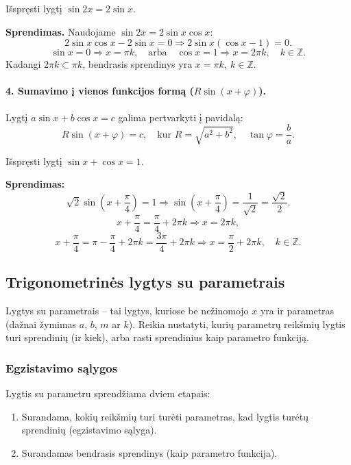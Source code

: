 \begin{example}
Išspręsti lygtį \(\sin 2x = 2\sin x\).

\textbf{Sprendimas.} Naudojame \(\sin 2x = 2\sin x \cos x\):
\[
2\sin x \cos x - 2\sin x = 0 \Rightarrow 2\sin x(\cos x - 1) = 0.
\]
\[
\sin x = 0 \Rightarrow x = \pi k, \quad \text{arba} \quad \cos x = 1 \Rightarrow x = 2\pi k, \quad k \in \mathbb{Z}.
\]
Kadangi \(2\pi k \subset \pi k\), bendrasis sprendinys yra \(x = \pi k,\ k \in \mathbb{Z}\).
\end{example}

\paragraph{4. Sumavimo į vienos funkcijos formą (\(R\sin(x+\varphi)\)).}

Lygtį \(a\sin x + b\cos x = c\) galima pertvarkyti į pavidalą:
\[
R\sin(x + \varphi) = c, \quad \text{kur } R = \sqrt{a^2 + b^2},\quad \tan\varphi = \frac{b}{a}.
\]

\begin{example}
Išspręsti lygtį \(\sin x + \cos x = 1\).

\textbf{Sprendimas:}
\[
\sqrt{2}\sin\!\left(x + \frac{\pi}{4}\right) = 1 \Rightarrow \sin\!\left(x + \frac{\pi}{4}\right) = \frac{1}{\sqrt{2}} = \frac{\sqrt{2}}{2}.
\]
\[
x + \frac{\pi}{4} = \frac{\pi}{4} + 2\pi k \Rightarrow x = 2\pi k,
\]
\[
x + \frac{\pi}{4} = \pi - \frac{\pi}{4} + 2\pi k = \frac{3\pi}{4} + 2\pi k \Rightarrow x = \frac{\pi}{2} + 2\pi k,\quad k \in \mathbb{Z}.
\]
\end{example}

\subsection{Trigonometrinės lygtys su parametrais}

Lygtys su parametrais – tai lygtys, kuriose be nežinomojo \(x\) yra ir parametras (dažnai žymimas \(a\), \(b\), \(m\) ar \(k\)). Reikia nustatyti, kurių parametrų reikšmių lygtis turi sprendinių (ir kiek), arba rasti sprendinius kaip parametro funkciją.

\subsubsection{Egzistavimo sąlygos}

\begin{tcolorbox}[title={Pagrindinė strategija}]
Lygtis su parametru sprendžiama dviem etapais:
\begin{enumerate}[leftmargin=1.5cm]
    \item Surandama, kokių reikšmių turi turėti parametras, kad lygtis turėtų sprendinių (egzistavimo sąlyga).
    \item Surandamas bendrasis sprendinys (kaip parametro funkcija).
\end{enumerate}
\end{tcolorbox}

